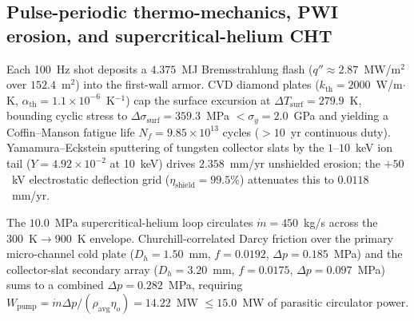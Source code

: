 \subsection{Pulse-periodic thermo-mechanics, PWI erosion, and
supercritical-helium CHT}
\label{subsec:pp_thermo}

Each 100~Hz shot deposits a $4.375$~MJ Bremsstrahlung flash
($q'' \approx 2.87$~MW/m$^2$ over $152.4$~m$^2$) into the first-wall
armor.  CVD diamond plates ($k_{\text{th}} = 2000$~W/m$\cdot$K,
$\alpha_{\text{th}} = 1.1 \times 10^{-6}$~K$^{-1}$) cap the surface
excursion at $\Delta T_{\text{surf}} = 279.9$~K, bounding cyclic stress
to $\Delta\sigma_{\text{surf}} = 359.3$~MPa $< \sigma_y = 2.0$~GPa and
yielding a Coffin--Manson fatigue life $N_f = 9.85 \times 10^{13}$
cycles ($> 10$~yr continuous duty).  Yamamura--Eckstein sputtering of
tungsten collector slats by the $1$--$10$~keV ion tail
($Y = 4.92 \times 10^{-2}$ at 10~keV) drives $2.358$~mm/yr unshielded
erosion; the $+50$~kV electrostatic deflection grid
($\eta_{\text{shield}} = 99.5\%$) attenuates this to
$0.0118$~mm/yr.

The $10.0$~MPa supercritical-helium loop circulates $\dot{m} =
450$~kg/s across the 300~K$\to$900~K envelope.  Churchill-correlated
Darcy friction over the primary micro-channel cold plate
($D_h = 1.50$~mm, $f = 0.0192$, $\Delta p = 0.185$~MPa) and the
collector-slat secondary array ($D_h = 3.20$~mm, $f = 0.0175$,
$\Delta p = 0.097$~MPa) sums to a combined $\Delta p = 0.282$~MPa,
requiring $W_{\text{pump}} = \dot{m}\Delta p/(\rho_{\text{avg}}
\eta_o) = 14.22$~MW $\le 15.0$~MW of parasitic circulator power.
